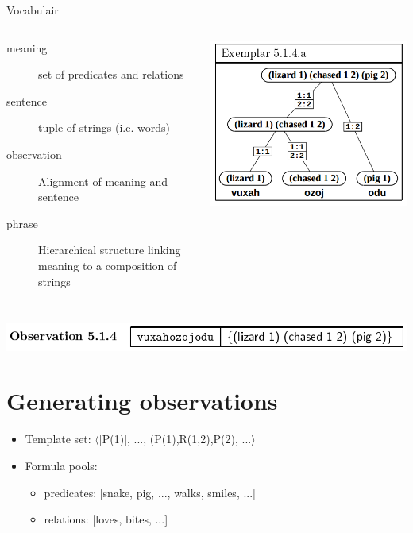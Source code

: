 \documentclass[11pt,a4paper,xcolor=dvipsnames]{beamer}
\begin{document}
\begin{frame}{Vocabulair}
  \begin{columns}[c]
      \begin{description}
        \item[meaning] set of predicates and relations
        \item[sentence] tuple of strings (i.e. words)
        \item[observation] Alignment of meaning and sentence
        \item[phrase] Hierarchical structure linking meaning to a composition of strings
      \end{description}
      \includegraphics[scale=0.2]{assets/examplar514a.png}
  \end{columns}
  \hfill \includegraphics[scale=0.2]{assets/observation514.png}
\end{frame}

\section{Generating observations}%
\begin{frame}

\begin{itemize}
  \item Template set: $\langle$[P(1)], ..., (P(1),R(1,2),P(2), ...$\rangle$
  \item Formula pools:
  \begin{itemize}
    \item predicates: [snake, pig, ..., walks, smiles, ...] %
    \item relations: [loves, bites, ...] %
  \end{itemize}
\end{itemize}

\end{frame}
\end{document}
